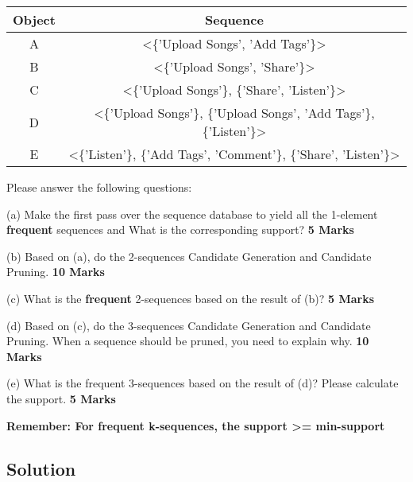 \documentclass[en,black,normal,10pt]{elegantnote}
\begin{document}
\begin{tabular}{|c|c|}
  \hline
    \rowcolor{Gray} %
    Object & Sequence \\
    \hline
    A & <\{'Upload Songs', 'Add Tags'\}> \\
    \hline
    B & <\{'Upload Songs', 'Share'\}> \\
    \hline
    C & <\{'Upload Songs'\}, \{'Share', 'Listen'\}> \\
    \hline
    D & <\{'Upload Songs'\}, \{'Upload Songs', 'Add Tags'\}, \{'Listen'\}> \\
    \hline
    E & <\{'Listen'\}, \{'Add Tags', 'Comment'\}, \{'Share', 'Listen'\}> \\
    \hline
\end{tabular}

Please answer the following questions:

(a) Make the first pass over the sequence database to yield all the 1-element \textbf{frequent} sequences and What is the corresponding support? \textbf{5 Marks}

(b) Based on (a), do the 2-sequences Candidate Generation and Candidate Pruning. \textbf{10 Marks}

(c) What is the \textbf{frequent} 2-sequences based on the result of (b)? \textbf{5 Marks}

(d) Based on (c), do the 3-sequences Candidate Generation and Candidate Pruning.
When a sequence should be pruned, you need to explain why. \textbf{10 Marks}

(e) What is the frequent 3-sequences based on the result of (d)?
Please calculate the support. \textbf{5 Marks}

\textbf{Remember: For frequent k-sequences, the support >= min-support}

\subsection*{Solution}
\end{document}
